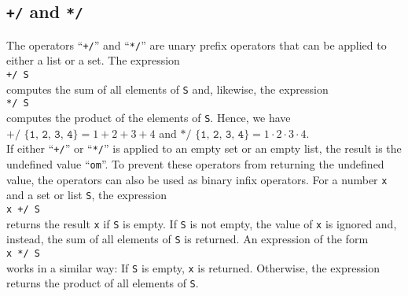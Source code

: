 \subsection{\texttt{+/} and \texttt{*/}}
The operators ``\texttt{+/}'' and ``\texttt{*/}'' are unary prefix operators that can be applied to
either a list or a set.  The expression
\\[0.2cm]
\hspace*{1.3cm}
 \texttt{+/ S}
\\[0.2cm]
computes the sum of all elements of \texttt{S} and, likewise, the expression
\\[0.2cm]
\hspace*{1.3cm}
 \texttt{*/ S}
\\[0.2cm]
computes the product of the elements of \texttt{S}.  Hence, we have
\\[0.2cm]
\hspace*{1.3cm}
$\texttt{+/ \{1, 2, 3, 4\}} = 1 + 2 + 3 + 4$ \quad and \quad $\texttt{*/ \{1, 2, 3, 4\}} = 1 \cdot 2 \cdot 3 \cdot 4$.
\\[0.2cm]
If either ``\texttt{+/}'' or ``\texttt{*/}'' is applied to an empty set or an empty list, the result
is the undefined value ``\texttt{om}''.  To prevent these operators from returning the undefined
value, the operators can also be used as binary infix operators. For a number \texttt{x} and a set
or list \texttt{S}, the expression
\\[0.2cm]
\hspace*{1.3cm}
\texttt{x +/ S}
\\[0.2cm]
returns the result \texttt{x} if \texttt{S} is empty.  If \texttt{S} is not empty, the value
of \texttt{x} is ignored and, instead, the sum of all elements of \texttt{S} is returned.
An expression of the form 
\\[0.2cm]
\hspace*{1.3cm}
\texttt{x */ S}
\\[0.2cm]
works in a similar way:  If \texttt{S} is empty, \texttt{x} is returned.  Otherwise, the expression
returns the product of all elements of \texttt{S}.

